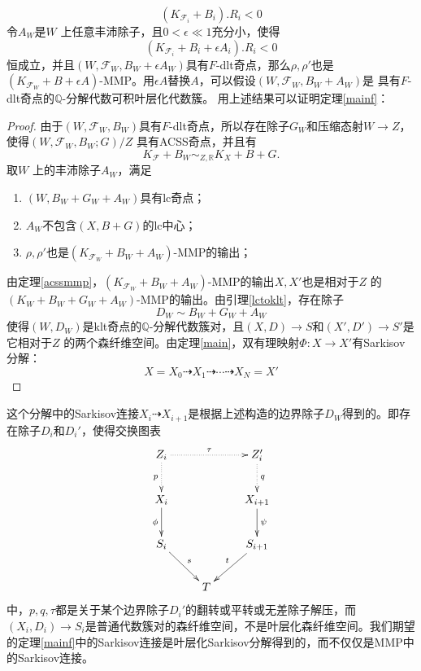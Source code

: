 \[ (K_{\mathcal{F}_{i}}+B_{i}).R_{i}<0 \]
令$A_{W}$是$W$ 上任意丰沛除子，且$0<\epsilon\ll 1$充分小，使得
\[ (K_{\mathcal{F}_{i}}+B_{i}+\epsilon A_{i}).R_{i}<0 \]
恒成立，并且$(W,\mathcal{F}_{W},B_{W}+\epsilon A_{W})$具有$F$-dlt奇点，那么$\rho,\rho'$也是$(K_{\mathcal{F}_{W}}+B+\epsilon A)$-MMP。用$\epsilon A$替换$A$，可以假设$(W,\mathcal{F}_{W},B_{W}+A_{W})$是 具有$F$-dlt奇点的$\mathbb{Q}$-分解代数可积叶层化代数簇。 
用上述结果可以证明定理\ref{mainf}：
\begin{proof}
  由于$(W,\mathcal{F}_{W},B_{W})$具有$F$-dlt奇点，所以存在除子$G_{W}$和压缩态射$W\to Z$，使得$(W,\mathcal{F}_{W},B_{W};G)/Z$ 具有ACSS奇点，并且有
  \[ K_{\mathcal{F}}+B_{W} \sim_{Z,\mathbb{R}} K_{X}+B+G. \]
 取$W$ 上的丰沛除子$A_{W}$，满足
 \begin{enumerate}
   \item $(W,B_{W}+G_{W}+A_{W}) $具有lc奇点；
   \item $A_{W}$不包含$(X,B+G)$的lc中心；
   \item $\rho,\rho' $也是$(K_{\mathcal{F}_{W}}+B_{W}+A_{W})$-MMP的输出；
 \end{enumerate}
 由定理\ref{acssmmp}，$(K_{\mathcal{F}_{W}}+B_{W}+A_{W})$-MMP的输出$X,X'$也是相对于$Z$ 的$(K_{W}+B_{W}+G_{W}+A_{W})$-MMP的输出。由引理\ref{lctoklt}，存在除子
\[ D_{W}\sim B_{W}+G_{W}+A_{W} \]
使得$(W,D_{W})$是klt奇点的$\mathbb{Q}$-分解代数簇对，且$(X,D)\to S $和$(X',D')\to S' $是它相对于$Z$ 的两个森纤维空间。由定理\ref{main}，双有理映射$\Phi:X\to X'$有Sarkisov分解：
\[ X=X_{0}\dashrightarrow X_{1}\dashrightarrow \cdots \dashrightarrow X_{N}=X' \] \end{proof}

\begin{remark}
 这个分解中的Sarkisov连接$X_{i}\dashrightarrow X_{i+1}$是根据上述构造的边界除子$D_{W}$得到的。即存在除子$D_{i}$和$D_{i}'$，使得交换图表
  \[ \xymatrix{
      Z_{i}\ar@{.>}[d]_p\ar@{.>}[rr]^{\tau}&&Z_{i}'\ar@{.>}[d]^q\\
      X_{i}\ar[d]_{\phi}&&X_{i+1}\ar[d]^\psi\\
      S_{i}\ar[rd]^s&&S_{i+1}\ar[ld]_t\\
      &T&} \]
      中，$p,q,\tau$都是关于某个边界除子$D_{i}'$的翻转或平转或无差除子解压，而$(X_{i},D_{i})\to S_{i}$是普通代数簇对的森纤维空间，不是叶层化森纤维空间。我们期望的定理\ref{mainf}中的Sarkisov连接是叶层化Sarkisov分解得到的，而不仅仅是MMP中的Sarkisov连接。
\end{remark}

